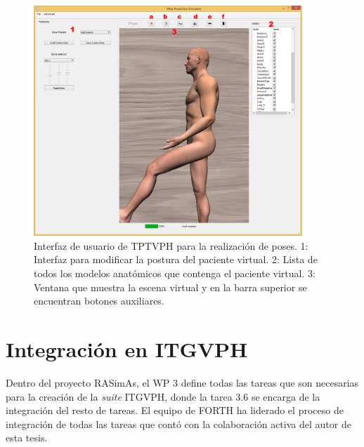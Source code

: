 \begin{figure}[htbp]
    \centering
    \includegraphics[width=0.9\textwidth]{IMG/posingui.png}
    \caption{Interfaz de usuario de \acs{TPTVPH} para la realización de poses. 1: Interfaz para modificar la postura del paciente virtual. 2: Lista de todos los modelos anatómicos que contenga el paciente virtual. 3: Ventana que muestra la escena virtual y en la barra superior se encuentran botones auxiliares.}
    \label{fig:posui}
\end{figure}



\section{Integración en  ITGVPH}
\label{rasim:herramienta}


Dentro del proyecto \ac{RASimAs}, el \acs{WP} 3 define todas las tareas que son necesarias para la creación de la \emph{suite} \ac{ITGVPH}, donde la tarea 3.6 se encarga de la integración
del resto de tareas. El equipo de \ac{FORTH} ha liderado el proceso de integración de todas las tareas que contó con la colaboración activa del autor de esta tesis.



